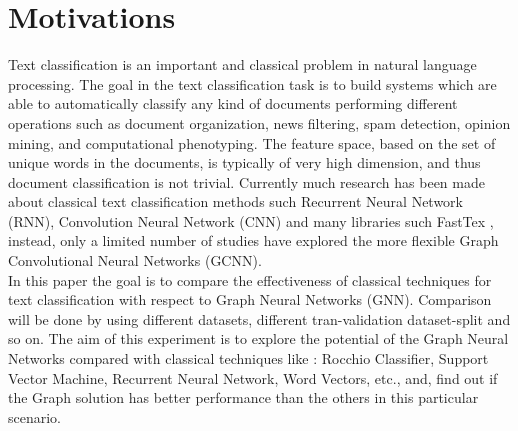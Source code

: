 \section{Motivations}
Text classification is an important and classical problem in natural language processing. \newline
The goal in the text classification task is to build systems which are able to automatically classify any kind of documents performing different operations such as document organization, news filtering, spam detection, opinion mining, and computational phenotyping. The feature space, based on the set of unique words in the documents, is typically of very high dimension, and thus document classification is not trivial. Currently much research has been made about classical text classification methods such Recurrent Neural Network (RNN), Convolution Neural Network (CNN) and many libraries such FastTex , instead, only a limited number of studies have explored the more flexible Graph Convolutional Neural Networks (GCNN).\\
In this paper the goal is to compare the effectiveness of classical techniques for text classification with respect to Graph Neural Networks (GNN). Comparison will be done  by using different datasets, different tran-validation dataset-split and so on.
The aim of this experiment is to explore the potential of the Graph Neural Networks compared with classical techniques like : Rocchio Classifier, Support Vector Machine, Recurrent Neural Network, Word Vectors, etc., and, find out if the Graph solution has better performance than the others in this particular scenario.
